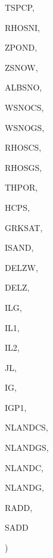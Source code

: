 {\begin{DoxyParamCaption}
\item[{real, dimension (ilg)}]{T\+S\+P\+C\+P, }
\item[{real, dimension(ilg)}]{R\+H\+O\+S\+N\+I, }
\item[{real, dimension (ilg)}]{Z\+P\+O\+N\+D, }
\item[{real, dimension (ilg)}]{Z\+S\+N\+O\+W, }
\item[{real, dimension(ilg)}]{A\+L\+B\+S\+N\+O, }
\item[{real, dimension(ilg)}]{W\+S\+N\+O\+C\+S, }
\item[{real, dimension(ilg)}]{W\+S\+N\+O\+G\+S, }
\item[{real, dimension(ilg)}]{R\+H\+O\+S\+C\+S, }
\item[{real, dimension(ilg)}]{R\+H\+O\+S\+G\+S, }
\item[{real, dimension (ilg,ig)}]{T\+H\+P\+O\+R, }
\item[{real, dimension  (ilg,ig)}]{H\+C\+P\+S, }
\item[{real, dimension(ilg,ig)}]{G\+R\+K\+S\+A\+T, }
\item[{integer, dimension (ilg,ig)}]{I\+S\+A\+N\+D, }
\item[{real, dimension (ilg,ig)}]{D\+E\+L\+Z\+W, }
\item[{real, dimension  (ig)}]{D\+E\+L\+Z, }
\item[{integer}]{I\+L\+G, }
\item[{integer}]{I\+L1, }
\item[{integer}]{I\+L2, }
\item[{integer}]{J\+L, }
\item[{integer}]{I\+G, }
\item[{integer}]{I\+G\+P1, }
\item[{integer}]{N\+L\+A\+N\+D\+C\+S, }
\item[{integer}]{N\+L\+A\+N\+D\+G\+S, }
\item[{integer}]{N\+L\+A\+N\+D\+C, }
\item[{integer}]{N\+L\+A\+N\+D\+G, }
\item[{real, dimension  (ilg)}]{R\+A\+D\+D, }
\item[{real, dimension  (ilg)}]{S\+A\+D\+D}
\end{DoxyParamCaption}
)}\label{WPREP_8f_a8bd6e495bd4674e569184609d67fa736}

